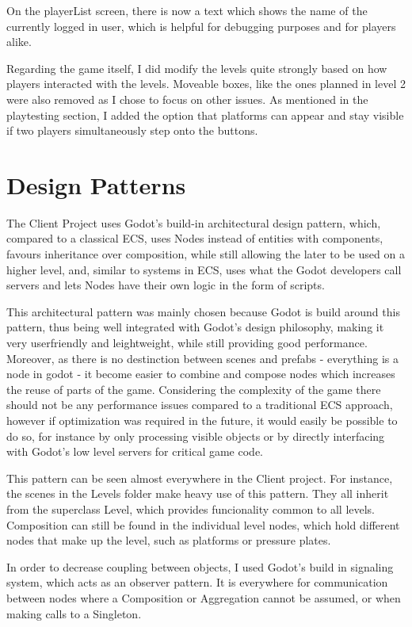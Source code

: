 \documentclass{article}
\begin{document}
\bigskip
On the playerList screen, there is now a text which shows the name of the currently logged in user, which is helpful for debugging purposes and for players alike.

\bigskip
Regarding the game itself, I did modify the levels quite strongly based on how players interacted with the levels. Moveable boxes, like the ones planned in level 2 were also removed as I chose to focus on other issues. As mentioned in the playtesting section, I added the option that platforms can appear and stay visible if two players simultaneously step onto the buttons. 

\section{Design Patterns}
The Client Project uses Godot's build-in architectural design pattern, which, compared to a classical ECS, uses Nodes instead of entities with components, favours inheritance over composition, while still allowing the later to be used on a higher level, and, similar to systems in ECS, uses what the Godot developers call servers and lets Nodes have their own logic in the form of scripts. 

This architectural pattern was mainly chosen because Godot is build around this pattern, thus being well integrated with Godot's design philosophy, making it very userfriendly and leightweight, while still providing good performance. Moreover, as there is no destinction between scenes and prefabs - everything is a node in godot - it become easier to combine and compose nodes which increases the reuse of parts of the game. Considering the complexity of the game there should not be any performance issues compared to a traditional ECS approach, however if optimization was required in the future, it would easily be possible to do so, for instance  by only processing visible objects or by directly interfacing with Godot's low level servers for critical game code. 

This pattern can be seen almost everywhere in the Client project. For instance, the scenes in the Levels folder make heavy use of this pattern. They all inherit from the superclass Level, which provides funcionality common to all levels. Composition can still be found in the individual level nodes, which hold different nodes that make up the level, such as platforms or pressure plates.

\bigskip
In order to decrease coupling between objects, I used Godot's build in signaling system, which acts as an observer pattern. It is everywhere for communication between nodes where a Composition or Aggregation cannot be assumed, or when making calls to a Singleton. 
\end{document}
